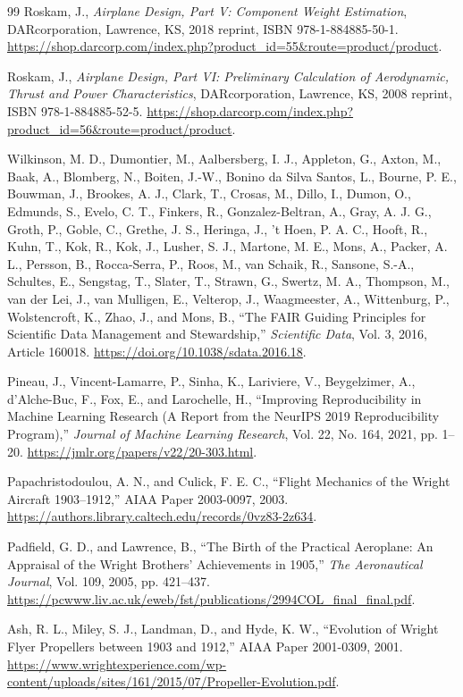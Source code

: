 \begin{thebibliography}{99}
 Roskam, J., \emph{Airplane Design, Part V: Component Weight Estimation}, DARcorporation, Lawrence, KS, 2018 reprint, ISBN 978-1-884885-50-1. \url{https://shop.darcorp.com/index.php?product_id=55&route=product/product}.

 Roskam, J., \emph{Airplane Design, Part VI: Preliminary Calculation of Aerodynamic, Thrust and Power Characteristics}, DARcorporation, Lawrence, KS, 2008 reprint, ISBN 978-1-884885-52-5. \url{https://shop.darcorp.com/index.php?product_id=56&route=product/product}.

 Wilkinson, M. D., Dumontier, M., Aalbersberg, I. J., Appleton, G., Axton, M., Baak, A., Blomberg, N., Boiten, J.-W., Bonino da Silva Santos, L., Bourne, P. E., Bouwman, J., Brookes, A. J., Clark, T., Crosas, M., Dillo, I., Dumon, O., Edmunds, S., Evelo, C. T., Finkers, R., Gonzalez-Beltran, A., Gray, A. J. G., Groth, P., Goble, C., Grethe, J. S., Heringa, J., 't Hoen, P. A. C., Hooft, R., Kuhn, T., Kok, R., Kok, J., Lusher, S. J., Martone, M. E., Mons, A., Packer, A. L., Persson, B., Rocca-Serra, P., Roos, M., van Schaik, R., Sansone, S.-A., Schultes, E., Sengstag, T., Slater, T., Strawn, G., Swertz, M. A., Thompson, M., van der Lei, J., van Mulligen, E., Velterop, J., Waagmeester, A., Wittenburg, P., Wolstencroft, K., Zhao, J., and Mons, B., ``The FAIR Guiding Principles for Scientific Data Management and Stewardship,'' \emph{Scientific Data}, Vol. 3, 2016, Article 160018. \url{https://doi.org/10.1038/sdata.2016.18}.

 Pineau, J., Vincent-Lamarre, P., Sinha, K., Lariviere, V., Beygelzimer, A., d'Alche-Buc, F., Fox, E., and Larochelle, H., ``Improving Reproducibility in Machine Learning Research (A Report from the NeurIPS 2019 Reproducibility Program),'' \emph{Journal of Machine Learning Research}, Vol. 22, No. 164, 2021, pp. 1--20. \url{https://jmlr.org/papers/v22/20-303.html}.

 Papachristodoulou, A. N., and Culick, F. E. C., ``Flight Mechanics of the Wright Aircraft 1903--1912,'' AIAA Paper 2003-0097, 2003. \url{https://authors.library.caltech.edu/records/0vz83-2z634}.

 Padfield, G. D., and Lawrence, B., ``The Birth of the Practical Aeroplane: An Appraisal of the Wright Brothers' Achievements in 1905,'' \emph{The Aeronautical Journal}, Vol. 109, 2005, pp. 421--437. \url{https://pcwww.liv.ac.uk/eweb/fst/publications/2994COL_final_final.pdf}.

 Ash, R. L., Miley, S. J., Landman, D., and Hyde, K. W., ``Evolution of Wright Flyer Propellers between 1903 and 1912,'' AIAA Paper 2001-0309, 2001. \url{https://www.wrightexperience.com/wp-content/uploads/sites/161/2015/07/Propeller-Evolution.pdf}.


\end{thebibliography}

